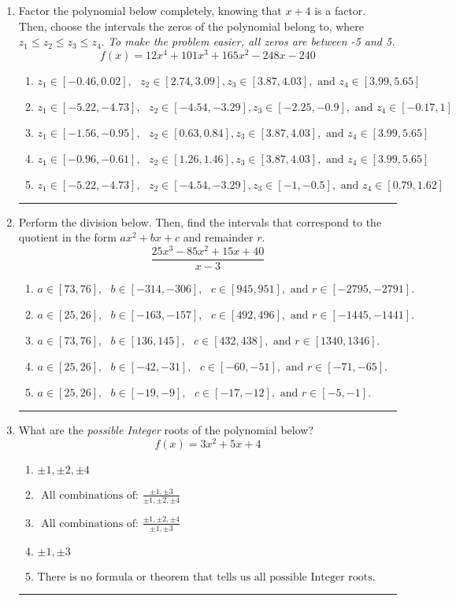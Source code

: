\documentclass[14pt]{extbook}
\newcommand{\litem}[1]{\item#1\hspace*{-1cm}\rule{\textwidth}{0.4pt}}
\begin{document}
\begin{enumerate}
{\begin{enumerate}[label=\Alph*.]
\end{enumerate} }
\litem{
Factor the polynomial below completely, knowing that $x + 4$ is a factor. Then, choose the intervals the zeros of the polynomial belong to, where $z_1 \leq z_2 \leq z_3 \leq z_4$. \textit{To make the problem easier, all zeros are between -5 and 5.}\[ f(x) = 12x^{4} +101 x^{3} +165 x^{2} -248 x -240 \]\begin{enumerate}[label=\Alph*.]
\item \( z_1 \in [-0.46, 0.02], \text{   }  z_2 \in [2.74, 3.09], z_3 \in [3.87, 4.03], \text{   and   } z_4 \in [3.99, 5.65] \)
\item \( z_1 \in [-5.22, -4.73], \text{   }  z_2 \in [-4.54, -3.29], z_3 \in [-2.25, -0.9], \text{   and   } z_4 \in [-0.17, 1] \)
\item \( z_1 \in [-1.56, -0.95], \text{   }  z_2 \in [0.63, 0.84], z_3 \in [3.87, 4.03], \text{   and   } z_4 \in [3.99, 5.65] \)
\item \( z_1 \in [-0.96, -0.61], \text{   }  z_2 \in [1.26, 1.46], z_3 \in [3.87, 4.03], \text{   and   } z_4 \in [3.99, 5.65] \)
\item \( z_1 \in [-5.22, -4.73], \text{   }  z_2 \in [-4.54, -3.29], z_3 \in [-1, -0.5], \text{   and   } z_4 \in [0.79, 1.62] \)

\end{enumerate} }
\litem{
Perform the division below. Then, find the intervals that correspond to the quotient in the form $ax^2+bx+c$ and remainder $r$.\[ \frac{25x^{3} -85 x^{2} +15 x + 40}{x -3} \]\begin{enumerate}[label=\Alph*.]
\item \( a \in [73, 76], \text{   } b \in [-314, -306], \text{   } c \in [945, 951], \text{   and   } r \in [-2795, -2791]. \)
\item \( a \in [25, 26], \text{   } b \in [-163, -157], \text{   } c \in [492, 496], \text{   and   } r \in [-1445, -1441]. \)
\item \( a \in [73, 76], \text{   } b \in [136, 145], \text{   } c \in [432, 438], \text{   and   } r \in [1340, 1346]. \)
\item \( a \in [25, 26], \text{   } b \in [-42, -31], \text{   } c \in [-60, -51], \text{   and   } r \in [-71, -65]. \)
\item \( a \in [25, 26], \text{   } b \in [-19, -9], \text{   } c \in [-17, -12], \text{   and   } r \in [-5, -1]. \)

\end{enumerate} }
\litem{
What are the \textit{possible Integer} roots of the polynomial below?\[ f(x) = 3x^{2} +5 x + 4 \]\begin{enumerate}[label=\Alph*.]
\item \( \pm 1,\pm 2,\pm 4 \)
\item \( \text{ All combinations of: }\frac{\pm 1,\pm 3}{\pm 1,\pm 2,\pm 4} \)
\item \( \text{ All combinations of: }\frac{\pm 1,\pm 2,\pm 4}{\pm 1,\pm 3} \)
\item \( \pm 1,\pm 3 \)
\item \( \text{There is no formula or theorem that tells us all possible Integer roots.} \)


\end{enumerate}}
\end{enumerate}
\end{document}
